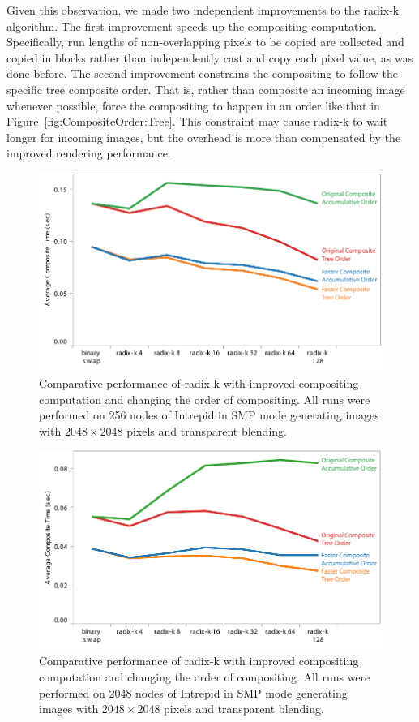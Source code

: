 \documentclass{vgtc}                          %
\begin{document}
Given this observation, we made two independent improvements to the radix-k
algorithm.  The first improvement speeds-up the compositing computation.
Specifically, run lengths of non-overlapping pixels to be copied are
collected and copied in blocks rather than independently cast and copy each
pixel value, as was done before.  The second improvement constrains the
compositing to follow the specific tree composite order.  That is, rather
than composite an incoming image whenever possible, force the compositing
to happen in an order like that in Figure~\ref{fig:CompositeOrder:Tree}.
This constraint may cause radix-k to wait longer for incoming images, but
the overhead is more than compensated by the improved rendering
performance.

\begin{figure}[htbp]
  \centering
  \includegraphics[width=\linewidth]{images/CompositeImprovements0256}
  \caption{Comparative performance of radix-k with improved compositing
    computation and changing the order of compositing.  All runs were
    performed on 256 nodes of Intrepid in SMP mode generating images with
    $2048 \times 2048$ pixels and transparent blending.}
  \label{fig:IceTCompositeImprovements0256}
\end{figure}

\begin{figure}[htbp]
  \centering
  \includegraphics[width=\linewidth]{images/CompositeImprovements2048}
  \caption{Comparative performance of radix-k with improved compositing
    computation and changing the order of compositing.  All runs were
    performed on 2048 nodes of Intrepid in SMP mode generating images with
    $2048 \times 2048$ pixels and transparent blending.}
  \label{fig:IceTCompositeImprovements2048}
\end{figure}
\end{document}
